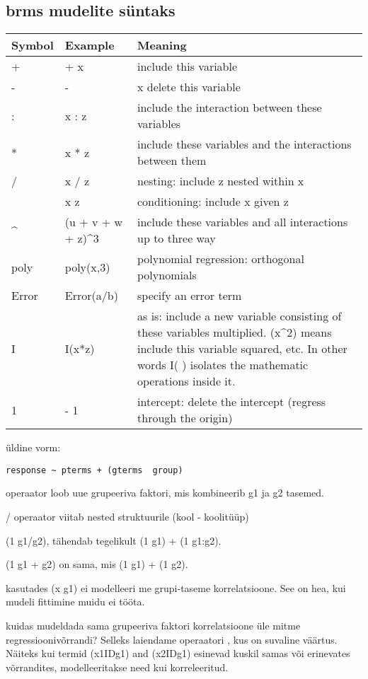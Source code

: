 \documentclass[]{article}
\providecommand{\tightlist}{%
  \setlength{\itemsep}{0pt}\setlength{\parskip}{0pt}}
\begin{document}
\subsection{brms mudelite süntaks}\label{brms-mudelite-suntaks}

\begin{longtable}[]{@{}lll@{}}
\toprule
Symbol & Example & Meaning\tabularnewline
\midrule
\endhead
+ & + x & include this variable\tabularnewline
- & - & x delete this variable\tabularnewline
: & x : z & include the interaction between these
variables\tabularnewline
* & x * z & include these variables and the interactions between
them\tabularnewline
/ & x / z & nesting: include z nested within x\tabularnewline
\textbar{} & x \textbar{} z & conditioning: include x given
z\tabularnewline
\^{} & (u + v + w + z)\^{}3 & include these variables and all
interactions up to three way\tabularnewline
poly & poly(x,3) & polynomial regression: orthogonal
polynomials\tabularnewline
Error & Error(a/b) & specify an error term\tabularnewline
I & I(x*z) & as is: include a new variable consisting of these variables
multiplied. (x\^{}2) means include this variable squared, etc. In other
words I( ) isolates the mathematic operations inside it.\tabularnewline
1 & - 1 & intercept: delete the intercept (regress through the
origin)\tabularnewline
\bottomrule
\end{longtable}

üldine vorm:

\texttt{response\ \textasciitilde{}\ pterms\ +\ (gterms\ \textbar{}\ group)}

\begin{description}
\tightlist
\item[kasuta g1:g2 või g1/g2, kui nii g1 kui g2 on sobilikud grupeerivad
faktorid.]
operaator loob uue grupeeriva faktori, mis kombineerib g1 ja g2 tasemed.
\end{description}

/ operaator viitab nested struktuurile (kool - koolitüüp)

(1 \textbar{} g1/g2), tähendab tegelikult (1 \textbar{} g1) + (1
\textbar{} g1:g2).

(1 \textbar{} g1 + g2) on sama, mis (1 \textbar{} g1) + (1 \textbar{}
g2).

\textbar{}\textbar{} kasutades (x \textbar{}\textbar{} g1) ei modelleeri
me grupi-taseme korrelatsioone. See on hea, kui mudeli fittimine muidu
ei tööta.

kuidas mudeldada sama grupeeriva faktori korrelatsioone üle mitme
regressioonivõrrandi? Selleks laiendame \textbar{} operaatori
\textbar{}\textbar{}, kus on suvaline väärtus. Näiteks kui termid
(x1\textbar{}ID\textbar{}g1) and (x2\textbar{}ID\textbar{}g1) esinevad
kuskil samas või erinevates võrrandites, modelleeritakse need kui
korreleeritud.
\end{document}
